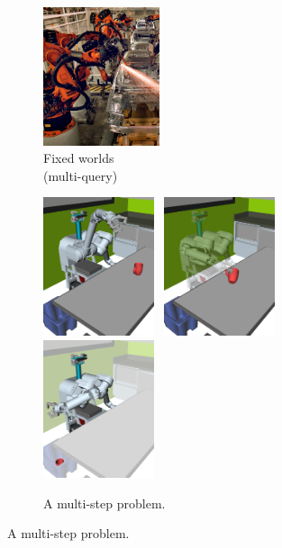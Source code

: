 {
\setlength{\offsetpage}{1.0in}
\begin{figure}[t]
\begin{widepage}
\begin{center}

   \begin{subfigure}[t]{1.4in}
      \centering
      \includegraphics[height=1.6in]{figs/car-robots.jpg}
      \caption{Fixed worlds\\
         (multi-query)}
   \end{subfigure}%
   \quad%
   \begin{subfigure}[t]{3.9in}
      \centering
      \includegraphics[height=1.6in]{figs/testherb-b.png}%
      \,%
      \includegraphics[height=1.6in]{figs/testherb-c.png}%
      \,%
      \includegraphics[height=1.6in]{figs/testherb-d.png}
      \caption{A multi-step problem.}
   \end{subfigure}%

\end{center}
\end{widepage}
\end{figure}}
